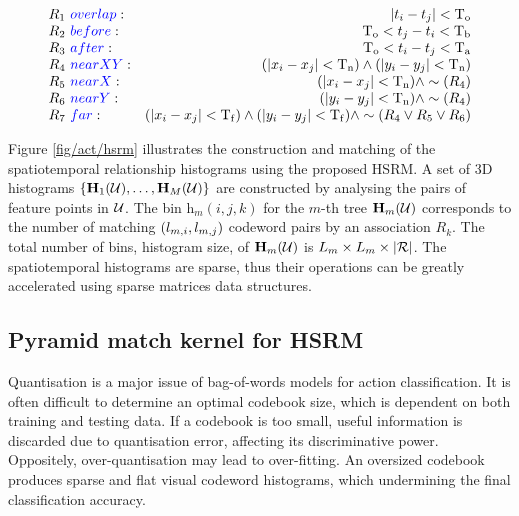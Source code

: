 \begin{equation}
	\centering 
	\begin{array}{lr}
		R_{1}~{\color{blue}overlap}: & |t_i - t_j| < \mathrm{T_{o}} \\
		R_{2}~{\color{blue}before}: & \mathrm{T_{o}} < t_j - t_i < \mathrm{T_{b}} \\
		R_{3}~{\color{blue}after}: & \mathrm{T_{o}} < t_i - t_j < \mathrm{T_{a}} \\
		R_{4}~{\color{blue}nearXY}: & (|x_i - x_j| < \mathrm{T_{n}}) \wedge (|y_i - y_j| < \mathrm{T_{n}}) \\
		R_{5}~{\color{blue}nearX}: & (|x_i - x_j| < \mathrm{T_{n}}) \wedge \sim(R_{4}) \\
		R_{6}~{\color{blue}nearY}: & (|y_i - y_j| < \mathrm{T_{n}}) \wedge \sim(R_{4}) \\
		R_{7}~{\color{blue}far}: & (|x_i - x_j| < \mathrm{T_{f}}) \wedge (|y_i - y_j| < \mathrm{T_{f}}) \wedge \sim(R_{4} \vee R_{5} \vee R_{6})
	\end{array}
\end{equation}

Figure \ref{fig/act/hsrm} illustrates the construction and matching of the spatiotemporal relationship histograms using the proposed HSRM. 
A set of 3D histograms $\{ \mathbf{H}_1(\mathcal{U}),\dots,\mathbf{H}_{M}(\mathcal{U})\}$ are constructed by analysing the pairs of feature points in $\mathcal{U}$. The bin $\mathrm{h}_{m}(i,j,k)$ for the $m$-th tree $\mathbf{H}_{m}(\mathcal{U})$ corresponds to the number of matching $(l_{m,i},l_{m,j})$ codeword pairs by an association $R_k$. The total number of bins, \ie histogram size, of $\mathbf{H}_m(\mathcal{U})$ is $L_m \times L_m \times |\mathcal{R}|$. The spatiotemporal histograms are sparse, thus their operations can be greatly accelerated using sparse matrices data structures.  

\subsection{Pyramid match kernel for HSRM}
Quantisation is a major issue of bag-of-words models for action classification. It is often difficult to determine an optimal codebook size, which is dependent on both training and testing data. 
If a codebook is too small, useful information is discarded due to quantisation error, affecting its discriminative power. 
Oppositely, over-quantisation may lead to over-fitting. An oversized codebook produces sparse and flat visual codeword histograms, which undermining the final classification accuracy.  

